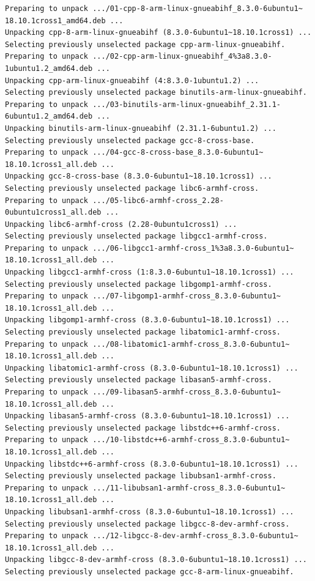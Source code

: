 \begin{verbatim}
Preparing to unpack .../01-cpp-8-arm-linux-gnueabihf_8.3.0-6ubuntu1~
18.10.1cross1_amd64.deb ...
Unpacking cpp-8-arm-linux-gnueabihf (8.3.0-6ubuntu1~18.10.1cross1) ...
Selecting previously unselected package cpp-arm-linux-gnueabihf.
Preparing to unpack .../02-cpp-arm-linux-gnueabihf_4%3a8.3.0-
1ubuntu1.2_amd64.deb ...
Unpacking cpp-arm-linux-gnueabihf (4:8.3.0-1ubuntu1.2) ...
Selecting previously unselected package binutils-arm-linux-gnueabihf.
Preparing to unpack .../03-binutils-arm-linux-gnueabihf_2.31.1-
6ubuntu1.2_amd64.deb ...
Unpacking binutils-arm-linux-gnueabihf (2.31.1-6ubuntu1.2) ...
Selecting previously unselected package gcc-8-cross-base.
Preparing to unpack .../04-gcc-8-cross-base_8.3.0-6ubuntu1~
18.10.1cross1_all.deb ...
Unpacking gcc-8-cross-base (8.3.0-6ubuntu1~18.10.1cross1) ...
Selecting previously unselected package libc6-armhf-cross.
Preparing to unpack .../05-libc6-armhf-cross_2.28-
0ubuntu1cross1_all.deb ...
Unpacking libc6-armhf-cross (2.28-0ubuntu1cross1) ...
Selecting previously unselected package libgcc1-armhf-cross.
Preparing to unpack .../06-libgcc1-armhf-cross_1%3a8.3.0-6ubuntu1~
18.10.1cross1_all.deb ...
Unpacking libgcc1-armhf-cross (1:8.3.0-6ubuntu1~18.10.1cross1) ...
Selecting previously unselected package libgomp1-armhf-cross.
Preparing to unpack .../07-libgomp1-armhf-cross_8.3.0-6ubuntu1~
18.10.1cross1_all.deb ...
Unpacking libgomp1-armhf-cross (8.3.0-6ubuntu1~18.10.1cross1) ...
Selecting previously unselected package libatomic1-armhf-cross.
Preparing to unpack .../08-libatomic1-armhf-cross_8.3.0-6ubuntu1~
18.10.1cross1_all.deb ...
Unpacking libatomic1-armhf-cross (8.3.0-6ubuntu1~18.10.1cross1) ...
Selecting previously unselected package libasan5-armhf-cross.
Preparing to unpack .../09-libasan5-armhf-cross_8.3.0-6ubuntu1~
18.10.1cross1_all.deb ...
Unpacking libasan5-armhf-cross (8.3.0-6ubuntu1~18.10.1cross1) ...
Selecting previously unselected package libstdc++6-armhf-cross.
Preparing to unpack .../10-libstdc++6-armhf-cross_8.3.0-6ubuntu1~
18.10.1cross1_all.deb ...
Unpacking libstdc++6-armhf-cross (8.3.0-6ubuntu1~18.10.1cross1) ...
Selecting previously unselected package libubsan1-armhf-cross.
Preparing to unpack .../11-libubsan1-armhf-cross_8.3.0-6ubuntu1~
18.10.1cross1_all.deb ...
Unpacking libubsan1-armhf-cross (8.3.0-6ubuntu1~18.10.1cross1) ...
Selecting previously unselected package libgcc-8-dev-armhf-cross.
Preparing to unpack .../12-libgcc-8-dev-armhf-cross_8.3.0-6ubuntu1~
18.10.1cross1_all.deb ...
Unpacking libgcc-8-dev-armhf-cross (8.3.0-6ubuntu1~18.10.1cross1) ...
Selecting previously unselected package gcc-8-arm-linux-gnueabihf.

\end{verbatim}
